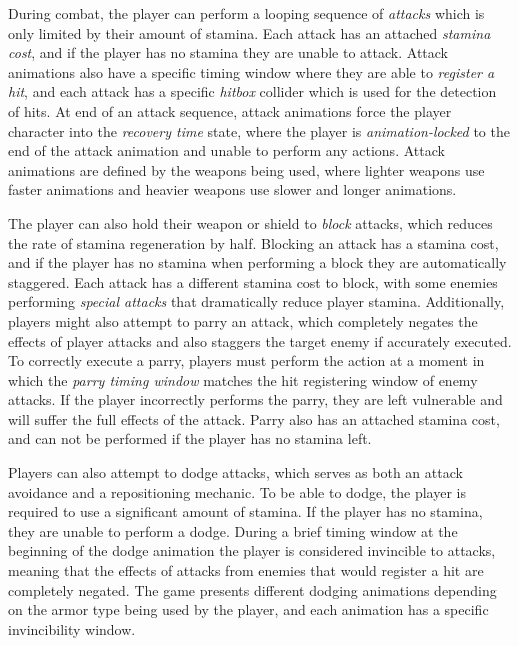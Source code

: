 During combat, the player can perform a looping sequence of \emph{attacks} which is only limited by their amount of stamina. Each attack has an attached \emph{stamina cost}, and if the player has no stamina they are unable to attack. Attack animations also have a specific timing window where they are able to \emph{register a hit}, and each attack has a specific \emph{hitbox} collider which is used for the detection of hits. At end of an attack sequence, attack animations force the player character into the \emph{recovery time} state, where the player is \emph{animation-locked} to the end of the attack animation and unable to perform any actions. Attack animations are defined by the weapons being used, where lighter weapons use faster animations and heavier weapons use slower and longer animations.

The player can also hold their weapon or shield to \emph{block} attacks, which reduces the rate of stamina regeneration by half. Blocking an attack has a stamina cost, and if the player has no stamina when performing a block they are automatically staggered. Each attack has a different stamina cost to block, with some enemies performing \emph{special attacks} that dramatically reduce player stamina. Additionally, players might also attempt to parry an attack, which completely negates the effects of player attacks and also staggers the target enemy if accurately executed. To correctly execute a parry, players must perform the action at a moment in which the \emph{parry timing window} matches the hit registering window of enemy attacks. If the player incorrectly performs the parry, they are left vulnerable and will suffer the full effects of the attack. Parry also has an attached stamina cost, and can not be performed if the player has no stamina left. 

Players can also attempt to dodge attacks, which serves as both an attack avoidance and a repositioning mechanic. To be able to dodge, the player is required to use a significant amount of stamina. If the player has no stamina, they are unable to perform a dodge. During a brief timing window at the beginning of the dodge animation the player is considered invincible to attacks, meaning that the effects of attacks from enemies that would register a hit are completely negated. The game presents different dodging animations depending on the armor type being used by the player, and each animation has a specific invincibility window.


